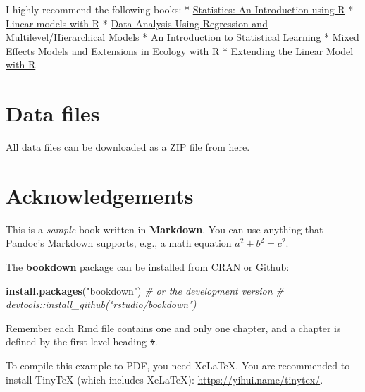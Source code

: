 \documentclass[
]{book}
\newenvironment{Shaded}{\begin{snugshade}}{\end{snugshade}}
\newcommand{\CommentTok}[1]{\textcolor[rgb]{0.56,0.35,0.01}{\textit{#1}}}
\newcommand{\KeywordTok}[1]{\textcolor[rgb]{0.13,0.29,0.53}{\textbf{#1}}}
\newcommand{\NormalTok}[1]{#1}
\newcommand{\StringTok}[1]{\textcolor[rgb]{0.31,0.60,0.02}{#1}}
\theoremstyle{definition}
\theoremstyle{definition}
\theoremstyle{definition}
\theoremstyle{remark}
\begin{document}
I highly recommend the following books:
* \href{https://www.wiley.com/en-gb/Statistics\%3A+An+Introduction+using+R-p-9780470022986}{Statistics: An Introduction using R}
* \href{https://www.crcpress.com/Linear-Models-with-R/Faraway/p/book/9781439887332}{Linear models with R}
* \href{http://www.stat.columbia.edu/~gelman/arm/}{Data Analysis Using Regression and Multilevel/Hierarchical Models}
* \href{http://www-bcf.usc.edu/~gareth/ISL/}{An Introduction to Statistical Learning}
* \href{https://www.springer.com/gb/book/9780387874579}{Mixed Effects Models and Extensions in Ecology with R}
* \href{https://www.amazon.co.uk/Extending-Linear-Model-Generalized-Nonparametric/dp/158488424X}{Extending the Linear Model with R}

\hypertarget{data-files}{%
\section*{Data files}\label{data-files}}

All data files can be downloaded as a ZIP file from \href{https://exeter-data-analytics.github.io/StatModelling/dataFiles.zip}{here}.

\hypertarget{acknowledgements}{%
\section*{Acknowledgements}\label{acknowledgements}}

This is a \emph{sample} book written in \textbf{Markdown}. You can use anything that Pandoc's Markdown supports, e.g., a math equation \(a^2 + b^2 = c^2\).

The \textbf{bookdown} package can be installed from CRAN or Github:

\begin{Shaded}
\begin{Highlighting}[]
\KeywordTok{install.packages}\NormalTok{(}\StringTok{"bookdown"}\NormalTok{)}
\CommentTok{# or the development version}
\CommentTok{# devtools::install_github("rstudio/bookdown")}
\end{Highlighting}
\end{Shaded}

Remember each Rmd file contains one and only one chapter, and a chapter is defined by the first-level heading \texttt{\#}.

To compile this example to PDF, you need XeLaTeX. You are recommended to install TinyTeX (which includes XeLaTeX): \url{https://yihui.name/tinytex/}.
\end{document}
